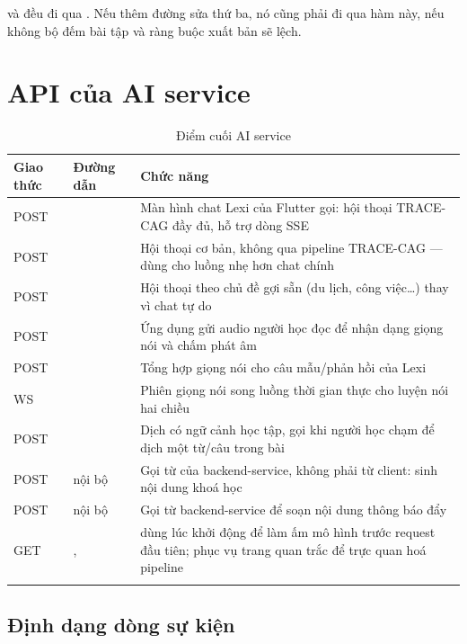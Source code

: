 \begin{luuy}
 và  đều đi qua
. Nếu thêm đường sửa thứ ba, nó cũng phải đi qua hàm này,
nếu không bộ đếm bài tập và ràng buộc xuất bản sẽ lệch.
\end{luuy}

\section{API của AI service}

\begin{longtable}{L{2.8cm} L{5.4cm} L{5.4cm}}
\toprule
\textbf{Giao thức} & \textbf{Đường dẫn} & \textbf{Chức năng}\\
\midrule
\endhead
POST &  & Màn hình chat Lexi của Flutter gọi: hội thoại TRACE-CAG đầy đủ, hỗ trợ dòng SSE\\
POST &  & Hội thoại cơ bản, không qua pipeline TRACE-CAG — dùng cho luồng nhẹ hơn chat chính\\
POST &  & Hội thoại theo chủ đề gợi sẵn (du lịch, công việc\ldots) thay vì chat tự do\\
POST &  & Ứng dụng gửi audio người học đọc để nhận dạng giọng nói và chấm phát âm\\
POST &  & Tổng hợp giọng nói cho câu mẫu/phản hồi của Lexi\\
WS &  & Phiên giọng nói song luồng thời gian thực cho luyện nói hai chiều\\
POST &  & Dịch có ngữ cảnh học tập, gọi khi người học chạm để dịch một từ/câu trong bài\\
POST & nội bộ  & Gọi từ  của backend-service, không phải từ client: sinh nội dung khoá học\\
POST & nội bộ  & Gọi từ backend-service để soạn nội dung thông báo đẩy\\
GET & ,  &  dùng lúc khởi động để làm ấm mô hình trước request đầu tiên;  phục vụ trang quan trắc để trực quan hoá pipeline\\
\bottomrule
\caption{Điểm cuối AI service}
\end{longtable}

\subsection{Định dạng dòng sự kiện}

